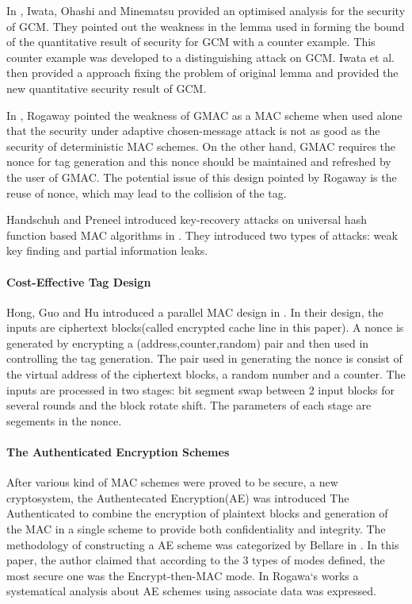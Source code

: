 \documentclass{article}
\begin{document}
In \cite{breaking}, Iwata, Ohashi and Minematsu provided an optimised analysis for the security of GCM. They pointed out the weakness in the lemma used in forming the bound of the quantitative result of security for GCM with a counter example. This counter example was developed to a distinguishing attack on GCM. Iwata et al. then provided a approach fixing the problem of original lemma and provided the new quantitative security result of GCM. 

In \cite{Rogaway2011}, Rogaway pointed the weakness of GMAC as a MAC scheme when used alone that the security under adaptive chosen-message attack is not as good as the security of deterministic MAC schemes. On the other hand, GMAC requires the nonce for tag generation and this nonce should be maintained and refreshed by the user of GMAC. The potential issue of this design pointed by Rogaway is the reuse of nonce, which may lead to the collision of the tag. 

Handschuh and Preneel introduced key-recovery attacks on universal hash function based MAC algorithms in \cite{key_recover}. They introduced two types of attacks: weak key finding and partial information leaks.

\paragraph{Cost-Effective Tag Design}
Hong, Guo and Hu introduced a parallel MAC design in \cite{cetd}.
In their design, the inputs are ciphertext blocks(called encrypted cache line in this paper). A nonce is generated by encrypting a (address,counter,random) pair and then used in controlling the tag generation. The pair used in generating the nonce is consist of the virtual address of the ciphertext blocks, a random number and a counter. The inputs are processed in two stages: bit segment swap between 2 input blocks for several rounds and the block rotate shift. The parameters of each stage are segements in the nonce.

\paragraph{The Authenticated Encryption Schemes}
After various kind of MAC schemes were proved to be secure, a new cryptosystem,
	  the Authentecated Encryption(AE) was introduced The Authenticated to combine the encryption of
plaintext blocks and generation of the MAC in a single scheme to provide both
confidentiality and integrity. The methodology of constructing a AE scheme was categorized by
Bellare in \cite{AE_mode}. In this paper, the author claimed that according to
the 3 types of modes defined, the most secure one was the Encrypt-then-MAC mode.
In Rogawa`s works \cite{aead} a systematical analysis about AE
schemes using associate data was expressed.  
\end{document}
